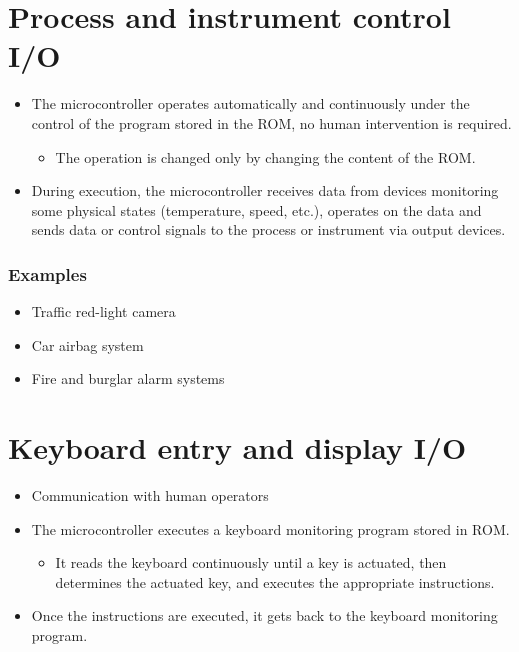 \documentclass[11pt]{article}
\begin{document}
\section{Process and instrument control I/O}
\label{sec:orgd528b11}
\begin{itemize}
\item The microcontroller operates automatically and continuously under the control of the program stored in the ROM, no human intervention is required.
\begin{itemize}
\item The operation is changed only by changing the content of the ROM.
\end{itemize}
\item During execution, the microcontroller receives data from devices monitoring some physical states (temperature, speed, etc.), operates on the data and sends data or control signals to the process or instrument via output devices.
\end{itemize}

\subsubsection{Examples}
\label{sec:org748b076}
\begin{itemize}
\item Traffic red-light camera
\item Car airbag system
\item Fire and burglar alarm systems
\end{itemize}

 \newpage

\section{Keyboard entry and display I/O}
\label{sec:org164e80f}
\begin{itemize}
\item Communication with human operators
\item The microcontroller executes a keyboard monitoring program stored in ROM.
\begin{itemize}
\item It reads the keyboard continuously until a key is actuated, then determines the actuated key, and executes the appropriate instructions.
\end{itemize}
\item Once the instructions are executed, it gets back to the keyboard monitoring program.
\end{itemize}
\end{document}
